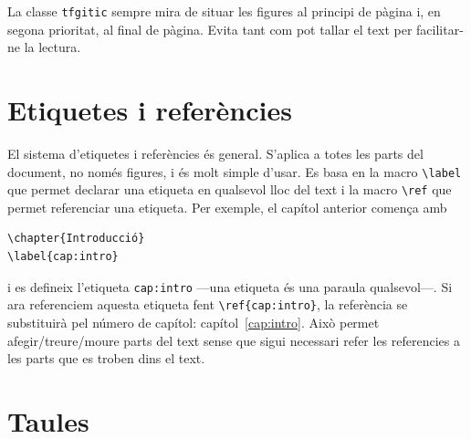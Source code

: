 \documentclass{tfgitic}[2024/07/01]
\begin{document}
La classe \texttt{tfgitic} sempre mira de situar les figures al
principi de pàgina i, en segona prioritat, al final de pàgina. Evita
tant com pot tallar el text per facilitar-ne la lectura.


\section{Etiquetes i referències}
\label{apa:etiquetes}

El sistema d'etiquetes i referències és general. S'aplica a totes les
parts del document, no només figures, i és molt simple d'usar. Es basa
en la macro \verb!\label! que permet declarar una etiqueta en
qualsevol lloc del text i la macro \verb!\ref! que permet referenciar
una etiqueta. Per exemple, el capítol anterior comença amb
\begin{verbatim}
\chapter{Introducció}
\label{cap:intro}
\end{verbatim}
i es defineix l'etiqueta \verb!cap:intro! ---una etiqueta és una
paraula qualsevol---. Si ara referenciem aquesta etiqueta fent
\verb!\ref{cap:intro}!, la referència se substituirà pel número de
capítol: capítol~\ref{cap:intro}. Això permet afegir/treure/moure
parts del text sense que sigui necessari refer les referencies a les
parts que es troben dins el text.


\section{Taules}
\end{document}
